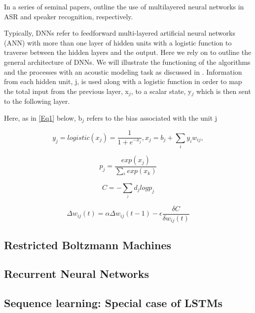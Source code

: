 \documentclass{article}
\begin{document}
In a series of seminal papers, \cite{bengio1989_acm,bengio1989} outline the use of multilayered neural networks in ASR and speaker recognition, respectively. 


Typically, DNNs refer to feedforward multi-layered artificial neural networks (ANN) with more than one layer of hidden units with a logistic function to traverse between the hidden layers and the output. Here we rely on \cite{hinton2012} to outline the general architecture of DNNs. We will illustrate the functioning of the algorithms and the processes with an acoustic modeling task as discussed in \cite{hinton2012}. Information from each hidden unit, j, is used along with a logistic function in order to map the total input from the previous layer, x$_j$, to a scalar state, y$_j$ which is then sent to the following layer.

Here, as in \ref{Eq1} below, b$_j$ refers to the bias associated with the unit j
\begin{center}

\begin{equation}
y_{j}=logistic(x_{j})=\frac{1}{1+e^{-x_{j}}}, x_{j} = b_{j} + \sum_{i}y_{i}w_{ij},
\label{Eq1}

\end{equation}

\begin{equation}
p_{j}=\frac{exp(x_{j})}{\sum_^{k}exp(x_{k})}
\end{equation}

\begin{equation}
C=-{\sum_^{j}}d_{j} log p_{j}
\end{equation}

\begin{equation}
\Delta w_{ij}(t)=\alpha\Delta w_{ij}(t-1) - \epsilon \frac{\delta C}{\delta w_{ij}(t)}
\end{equation}

\end{center}

\subsection{Restricted Boltzmann Machines}

\subsection{Recurrent Neural Networks}

\subsection{Sequence learning: Special case of LSTMs}
\end{document}
